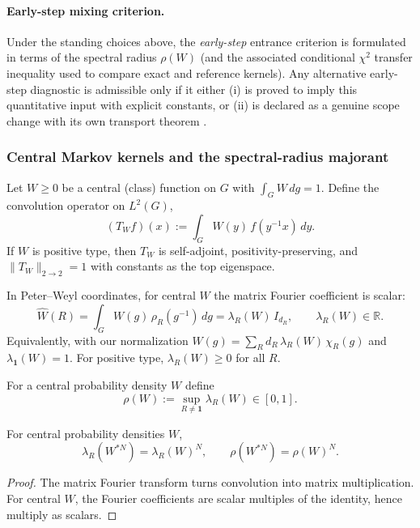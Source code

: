 \paragraph{Early-step mixing criterion.}
Under the standing choices above, the \emph{early-step} entrance criterion is formulated in terms of the spectral radius $\rho(W)$
(and the associated conditional $\chi^2$ transfer inequality used to compare exact and reference kernels).
Any alternative early-step diagnostic is admissible only if it either (i) is proved to imply this quantitative input with explicit constants,
or (ii) is declared as a genuine scope change with its own transport theorem .

\subsubsection{Central Markov kernels and the spectral-radius majorant}

Let $W\ge 0$ be a central (class) function on $G$ with $\int_G W\,dg=1$.
Define the convolution operator on $L^2(G)$,
\[
(T_W f)(x):=\int_G W(y)\,f(y^{-1}x)\,dy.
\]
If $W$ is positive type, then $T_W$ is self-adjoint, positivity-preserving, and
$\|T_W\|_{2\to 2}=1$ with constants as the top eigenspace.

In Peter--Weyl coordinates, for central $W$ the matrix Fourier coefficient is scalar:
\[
\widehat W(R)=\int_G W(g)\,\rho_R(g^{-1})\,dg = \lambda_R(W)\,I_{d_R},
\qquad \lambda_R(W)\in\mathbb R.
\]
Equivalently, with our normalization $W(g)=\sum_R d_R\,\lambda_R(W)\,\chi_R(g)$ and
$\lambda_{\mathbf 1}(W)=1$.
For positive type, $\lambda_R(W)\ge 0$ for all $R$.

\begin{definition}\label{def:rho_majorant}
For a central probability density $W$ define
\[
\rho(W):=\sup_{R\neq \mathbf 1}\lambda_R(W)\in[0,1].
\]
\end{definition}

\begin{lemma}\label{lem:rho_convolution}
For central probability densities $W$,
\[
\lambda_R(W^{*N})=\lambda_R(W)^N,\qquad
\rho(W^{*N})=\rho(W)^N.
\]
\end{lemma}

\begin{proof}
The matrix Fourier transform turns convolution into matrix multiplication.
For central $W$, the Fourier coefficients are scalar multiples of the identity, hence multiply as scalars.
\end{proof}

